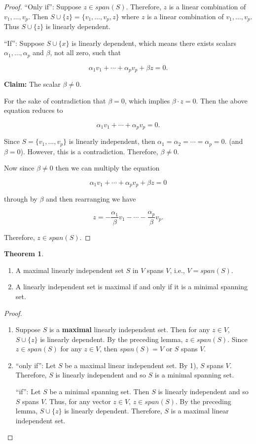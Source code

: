 \documentclass[12pt]{article}
\theoremstyle{definition}
\newtheorem{theorem}{Theorem}[section]  %
\begin{document}
\begin{proof}
``Only if'': Suppose $z \in span(S)$. Therefore, $z$ is a linear combination of
$v_1, \ldots, v_p$. Then $S \cup \{ z \} = \{v_1, \ldots, v_p, z\}$ where $z$
is a linear combination of $v_1, \ldots, v_p$. Thus $S \cup \{z\}$ is linearly
dependent.

``If'': Suppose $S \cup \{ x \}$ is linearly dependent, which means there
exists scalars $\alpha_1, \ldots, \alpha_p$ and $\beta$, not all zero, such
that

\[ \alpha_1 v_1 + \cdots + \alpha_p v_p + \beta z = 0. \]

\textbf{Claim:} The scalar $\beta \neq 0$.

For the sake of contradiction that $\beta = 0$, which implies $\beta \cdot z = 0$.
Then the above equation reduces to

\[ \alpha_1 v_1 + \cdots + \alpha_p v_p = 0. \]

Since $S = \{ v_1, \ldots, v_p \}$ is linearly independent, then
$\alpha_1 = \alpha_2 = \cdots = \alpha_p = 0$. (and $\beta = 0$). However,
this is a contradiction. Therefore, $\beta \neq 0$.

Now since $\beta \neq 0$ then we can multiply the equation

\[ \alpha_1 v_1 + \cdots + \alpha_p v_p + \beta z = 0 \]

through by $\beta$ and then rearranging we have

\[z = - \frac{\alpha_1}{\beta} v_1 - \cdots - \frac{\alpha_p}{\beta} v_p. \]

Therefore, $z \in span(S)$.
\end{proof}

\begin{theorem} $ $
\begin{enumerate}[label = (\arabic*)]
\item A maximal linearly independent set $S$ in $V$ spans $V$, i.e., $V = span(S)$.

\item A linearly independent set is maximal if and only if it is a minimal
spanning set.
\end{enumerate}
\end{theorem}

\begin{proof}
\begin{enumerate}[label = (\arabic*)]
\item Suppose $S$ is a \textbf{maximal} linearly independent set. Then for any
$z \in V$, $S \cup \{z\}$ is linearly dependent. By the preceding lemma,
$z \in span(S)$. Since $z \in span(S)$ for any $z \in V$, then $span(S) = V$ or
$S$ spans $V$.
\item ``only if'': Let $S$ be a maximal linear independent set. By 1), $S$ spans $V$.
Therefore, $S$ is linearly independent and so $S$ is a minimal spanning set.

``if'': Let $S$ be a minimal spanning set. Then $S$ is linearly independent and so
$S$ spans $V$. Thus, for any vector $z \in V$, $z \in span(S)$. By the preceding
lemma, $S \cup \{z\}$ is linearly dependent. Therefore, $S$ is a maximal linear
independent set.
\end{enumerate}
\end{proof}
\end{document}
